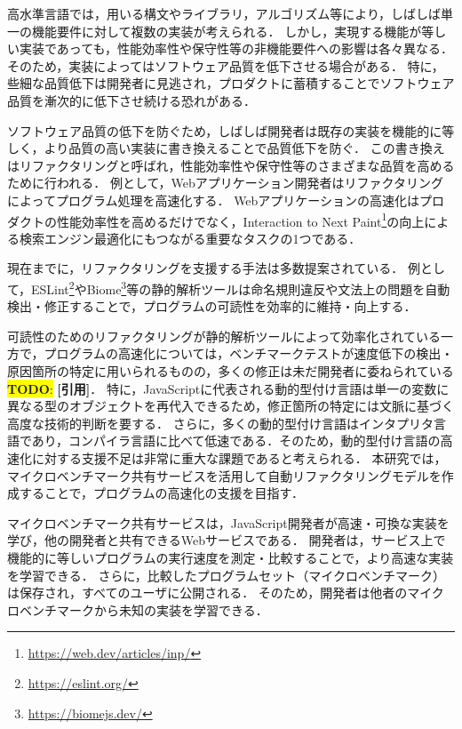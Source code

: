\documentclass[11pt]{jreport}
\newcommand{\todo}[1]{\colorbox{yellow}{{\bf TODO}:}{\color{red} {\textbf{[#1]}}}}
\begin{document}
高水準言語では，用いる構文やライブラリ，アルゴリズム等により，しばしば単一の機能要件に対して複数の実装が考えられる．
しかし，実現する機能が等しい実装であっても，性能効率性や保守性等の非機能要件への影響は各々異なる．
そのため，実装によってはソフトウェア品質を低下させる場合がある．
特に，些細な品質低下は開発者に見逃され，プロダクトに蓄積することでソフトウェア品質を漸次的に低下させ続ける恐れがある．

ソフトウェア品質の低下を防ぐため，しばしば開発者は既存の実装を機能的に等しく，より品質の高い実装に書き換えることで品質低下を防ぐ．
この書き換えはリファクタリングと呼ばれ，性能効率性や保守性等のさまざまな品質を高めるために行われる．
例として，Webアプリケーション開発者はリファクタリングによってプログラム処理を高速化する\cite{Selakovic_2016}．
Webアプリケーションの高速化はプロダクトの性能効率性を高めるだけでなく，Interaction to Next Paint\footnote{\url{https://web.dev/articles/inp/}}の向上による検索エンジン最適化にもつながる重要なタスクの1つである．

現在までに，リファクタリングを支援する手法は多数提案されている．
例として，ESLint\footnote{\url{https://eslint.org/}}やBiome\footnote{\url{https://biomejs.dev/}}等の静的解析ツールは命名規則違反や文法上の問題を自動検出・修正することで，プログラムの可読性を効率的に維持・向上する．

可読性のためのリファクタリングが静的解析ツールによって効率化されている一方で，プログラムの高速化については，ベンチマークテストが速度低下の検出・原因箇所の特定に用いられるものの，多くの修正は未だ開発者に委ねられている\todo{引用}．
特に，JavaScriptに代表される動的型付け言語は単一の変数に異なる型のオブジェクトを再代入できるため，修正箇所の特定には文脈に基づく高度な技術的判断を要する．
さらに，多くの動的型付け言語はインタプリタ言語であり，コンパイラ言語に比べて低速である．そのため，動的型付け言語の高速化に対する支援不足は非常に重大な課題であると考えられる．
本研究では，マイクロベンチマーク共有サービスを活用して自動リファクタリングモデルを作成することで，プログラムの高速化の支援を目指す．

マイクロベンチマーク共有サービスは，JavaScript開発者が高速・可換な実装を学び，他の開発者と共有できるWebサービスである．
開発者は，サービス上で機能的に等しいプログラムの実行速度を測定・比較することで，より高速な実装を学習できる．
さらに，比較したプログラムセット（マイクロベンチマーク）は保存され，すべてのユーザに公開される．
そのため，開発者は他者のマイクロベンチマークから未知の実装を学習できる．
\end{document}
